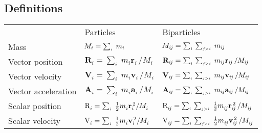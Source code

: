 \documentclass[10pt]{article}
\newcommand{\vR}{\mathbf{r}}
\newcommand{\vV}{\mathbf{v}}
\newcommand{\vA}{\mathbf{a}}
\newcommand{\VR}{\mathbf{R}}
\newcommand{\VV}{\mathbf{V}}
\newcommand{\VA}{\mathbf{A}}
\newcommand{\ER}{\mathrm{R}}
\newcommand{\EV}{\mathrm{V}}
\newcommand{\mM}{m}
\newcommand{\EM}{M}
\newcommand{\ri}{_i}
\newcommand{\dos}{^{\,2}}
\newcommand{\rij}{_{i\hspace{-0.081em}j}}
\begin{document}
\newpage \baselineskip=12pt

{\centering\subsection*{Def\hspace{+0.03em}initions}}

\begin{center}
\begin{tabular}{lll}
& Particles & Biparticles \hspace{-0.6em} \vspace{+0.9em} \\
Mass & $\hspace{-0.06em}\EM\ri = \sum_{\scriptscriptstyle i} \; \mM\ri$ & $\hspace{-0.06em}\EM\rij = \sum_{\scriptscriptstyle i} \, \sum_{\scriptscriptstyle j>i} \; \mM\rij$ \hspace{-0.6em} \vspace{+0.9em} \\
Vector position & $\VR\ri = \sum_{\scriptscriptstyle i} \; \mM\ri\vR\ri \, / \EM\ri$ & $\VR\rij = \sum_{\scriptscriptstyle i} \, \sum_{\scriptscriptstyle j>i} \; \mM\rij\vR\rij \, / \EM\rij$ \hspace{-0.6em} \vspace{+0.3em} \\
Vector velocity & $\VV\ri = \sum_{\scriptscriptstyle i} \; \mM\ri\vV\ri \, / \EM\ri$ & $\VV\rij = \sum_{\scriptscriptstyle i} \, \sum_{\scriptscriptstyle j>i} \; \mM\rij\vV\rij \, / \EM\rij$ \hspace{-0.6em} \vspace{+0.3em} \\
Vector acceleration & $\VA\ri = \sum_{\scriptscriptstyle i} \; \mM\ri\vA\ri \, / \EM\ri$ & $\VA\rij = \sum_{\scriptscriptstyle i} \, \sum_{\scriptscriptstyle j>i} \; \mM\rij\vA\rij \, / \EM\rij$ \hspace{-0.6em} \vspace{+0.9em} \\
Scalar position & $\ER\ri^{\vphantom{\dos}} = \sum_{\scriptscriptstyle i} \; \frac{1}{2}\mM\ri^{\vphantom{\dos}}\vR\ri\dos / \EM\ri^{\vphantom{\dos}}$ & $\ER\rij^{\vphantom{\dos}} = \sum_{\scriptscriptstyle i} \, \sum_{\scriptscriptstyle j>i} \; \frac{1}{2}\mM\rij^{\vphantom{\dos}}\vR\rij\dos \, / \EM\rij^{\vphantom{\dos}}$ \hspace{-0.6em} \vspace{+0.3em} \\
Scalar velocity & $\EV\ri^{\vphantom{\dos}} = \sum_{\scriptscriptstyle i} \; \frac{1}{2}\mM\ri^{\vphantom{\dos}}\vV\ri\dos / \EM\ri^{\vphantom{\dos}}$ & $\EV\rij^{\vphantom{\dos}} = \sum_{\scriptscriptstyle i} \, \sum_{\scriptscriptstyle j>i} \; \frac{1}{2}\mM\rij^{\vphantom{\dos}}\vV\rij\dos \, / \EM\rij^{\vphantom{\dos}}$ \hspace{-0.6em} \vspace{+0.3em} \\

\end{tabular}
\end{center}
\end{document}
